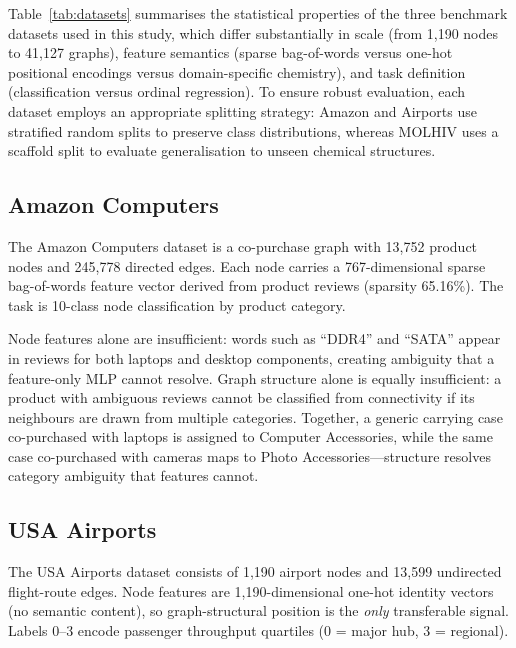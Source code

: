 \documentclass[conference]{IEEEtran}
\begin{document}
Table~\ref{tab:datasets} summarises the statistical properties of the three benchmark datasets used in this study, which differ substantially in scale (from 1,190 nodes to 41,127 graphs), feature semantics (sparse bag-of-words versus one-hot positional encodings versus domain-specific chemistry), and task definition (classification versus ordinal regression). To ensure robust evaluation, each dataset employs an appropriate splitting strategy: Amazon and Airports use stratified random splits to preserve class distributions, whereas MOLHIV uses a scaffold split to evaluate generalisation to unseen chemical structures.

\subsection{Amazon Computers}

The Amazon Computers dataset \cite{shchur2018} is a co-purchase graph with 13,752 product nodes and 245,778 directed edges. Each node carries a 767-dimensional sparse bag-of-words feature vector derived from product reviews (sparsity 65.16\%). The task is 10-class node classification by product category.

Node features alone are insufficient: words such as ``DDR4'' and ``SATA'' appear in reviews for both laptops and desktop components, creating ambiguity that a feature-only MLP cannot resolve. Graph structure alone is equally insufficient: a product with ambiguous reviews cannot be classified from connectivity if its neighbours are drawn from multiple categories. Together, a generic carrying case co-purchased with laptops is assigned to Computer Accessories, while the same case co-purchased with cameras maps to Photo Accessories---structure resolves category ambiguity that features cannot.

\subsection{USA Airports}

The USA Airports dataset \cite{ribeiro2017} consists of 1,190 airport nodes and 13,599 undirected flight-route edges. Node features are 1,190-dimensional one-hot identity vectors (no semantic content), so graph-structural position is the \emph{only} transferable signal. Labels 0--3 encode passenger throughput quartiles (0 = major hub, 3 = regional).
\end{document}
